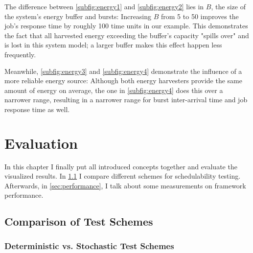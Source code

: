 \documentclass[a4paper,oneside]{csthesis}
\begin{document}
The difference between \cref{subfig:energy1} and \cref{subfig:energy2} lies in $B$, the size of the system's energy buffer and bursts: Increasing $B$ from 5 to 50 improves the job's response time by roughly 100 time units in our example. This demonstrates the fact that all harvested energy exceeding the buffer's capacity "spills over" and is lost in this system model; a larger buffer makes this effect happen less frequently.

Meanwhile, \cref{subfig:energy3} and \cref{subfig:energy4} demonstrate the influence of a more reliable energy source: Although both energy harvesters provide the same amount of energy on average, the one in \cref{subfig:energy4} does this over a narrower range, resulting in a narrower range for burst inter-arrival time and job response time as well.


\chapter{Evaluation}
\label{cha:eval}
In this chapter I finally put all introduced concepts together and evaluate the visualized results. In \cref{sec:eval-schemes} I compare different schemes for schedulability testing. Afterwards, in \cref{sec:performance}, I talk about some measurements on framework performance.

\section{Comparison of Test Schemes}
\label{sec:eval-schemes}

\subsection{Deterministic vs. Stochastic Test Schemes}
\end{document}
